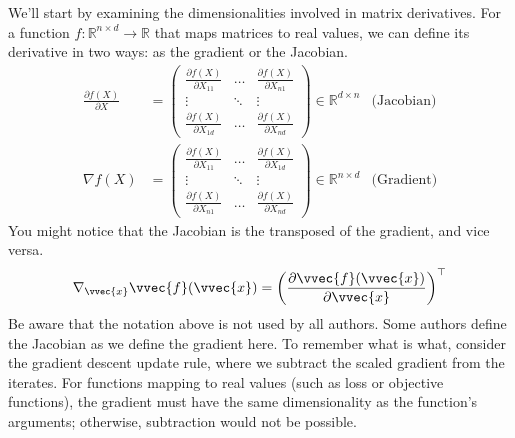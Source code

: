 \documentclass[letterpaper,10pt,english]{jupyterBook}
\begin{document}
\sphinxAtStartPar
We’ll start by examining the dimensionalities involved in matrix derivatives. For a function \(f:\mathbb{R}^{n\times d}\rightarrow \mathbb{R}\) that maps matrices to real values, we can define its derivative in two ways: as the gradient or the Jacobian.
\begin{align*}
    \frac{\partial f(X)}{\partial X} &=
    \begin{pmatrix}
    \frac{\partial f(X)}{\partial X_{11}} & \ldots & \frac{\partial f(X)}{\partial X_{n1}}\\
    \vdots & \ddots & \vdots\\ 
    \frac{\partial f(X)}{\partial X_{1d}} & \ldots & \frac{\partial f(X)}{\partial X_{nd}}
    \end{pmatrix}\in\mathbb{R}^{d\times n} &\text{(Jacobian)}\\
    \nabla{f(X)} &=
    \begin{pmatrix}
    \frac{\partial f(X)}{\partial X_{11}} & \ldots & \frac{\partial f(X)}{\partial X_{1d}}\\
    \vdots & \ddots & \vdots\\ 
    \frac{\partial f(X)}{\partial X_{n1}} & \ldots & \frac{\partial f(X)}{\partial X_{nd}}
    \end{pmatrix}\in\mathbb{R}^{n\times d} &\text{(Gradient)}
\end{align*}
\sphinxAtStartPar
You might notice that the Jacobian is the transposed of the gradient, and vice versa.
\begin{equation*}
\begin{split}\nabla_\vvec{x} \vvec{f}(\vvec{x}) = \left(\frac{\partial \vvec{f}(\vvec{x})}{\partial\vvec{x}}\right)^\top\end{split}
\end{equation*}
Be aware that the notation above is not used by all authors. Some authors define the Jacobian as we define the gradient here. To remember what is what, consider the gradient descent update rule, where we subtract the scaled gradient from the iterates. For functions mapping to real values (such as loss or objective functions), the gradient must have the same dimensionality as the function’s arguments; otherwise, subtraction would not be possible.
\end{document}
